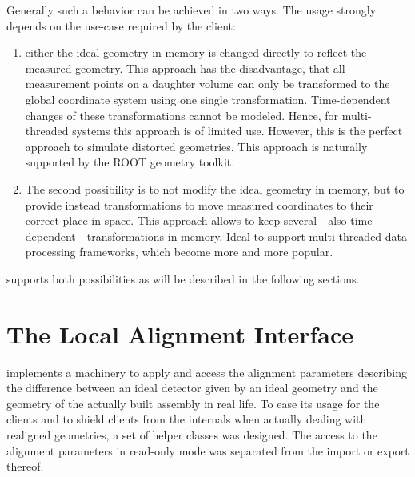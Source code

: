 \documentclass[10pt,a4paper]{article}
\begin{document}
\noindent
Generally such a behavior can be achieved in two ways. The usage strongly depends
on the use-case required by the client:
\begin{enumerate}
\item either the ideal geometry in memory is changed directly to 
      reflect the  measured geometry. This approach has the 
      disadvantage, that all measurement points on a daughter 
      volume can only be transformed to the global coordinate
      system using one single transformation. Time-dependent changes of 
      these transformations cannot be modeled. Hence, for multi-threaded
      systems this approach is of limited use. However, this is the 
      perfect approach to simulate distorted geometries. This approach 
      is naturally supported by the ROOT geometry toolkit.
\item The second possibility is to not modify the ideal geometry in memory,
      but to provide instead transformations to move measured coordinates 
      to their correct place in space. This approach allows to keep 
      several - also time-dependent - transformations in memory. 
      Ideal to support multi-threaded data processing frameworks, 
      which become more and more popular.
\end{enumerate}

\noindent
\DDA supports both possibilities as will be described in the following sections.



\vspace{3cm}

\newpage
\section{The Local Alignment Interface}
\label{sec:ddalign-user-manual-ddalign-interface}

\noindent
\DDA implements a machinery to apply and access the alignment parameters
describing the difference between an ideal detector given by an ideal geometry
and the geometry of the actually built assembly in real life.
To ease its usage for the clients and to shield clients from the 
internals when actually dealing with realigned geometries, a set of 
helper classes was designed. The access to the alignment parameters 
in read-only mode was separated from the import or export thereof.
\end{document}
